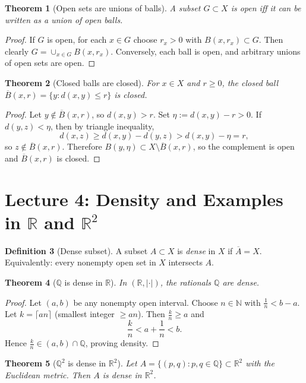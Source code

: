 \documentclass[11pt]{article}
\newtheorem{theorem}{Theorem}[section]
\theoremstyle{definition}
\newtheorem{definition}[theorem]{Definition}
\newcommand{\R}{\mathbb{R}}
\newcommand{\Q}{\mathbb{Q}}
\newcommand{\N}{\mathbb{N}}
\newcommand{\ol}[1]{\overline{#1}}
\begin{document}
\begin{theorem}[Open sets are unions of balls]
A subset $G\subset X$ is open iff it can be written as a union of open balls.
\end{theorem}

\begin{proof}
If $G$ is open, for each $x\in G$ choose $r_x>0$ with $B(x,r_x)\subset G$.
Then clearly $G=\cup_{x\in G} B(x,r_x)$.
Conversely, each ball is open, and arbitrary unions of open sets are open.
\end{proof}

\begin{theorem}[Closed balls are closed]
For $x\in X$ and $r\ge0$, the closed ball $\overline{B}(x,r)=\{y:d(x,y)\le r\}$ is closed.
\end{theorem}

\begin{proof}
Let $y\notin \overline{B}(x,r)$, so $d(x,y)>r$. Set $\eta:=d(x,y)-r>0$.
If $d(y,z)<\eta$, then by triangle inequality,
\[
d(x,z)\ge d(x,y)-d(y,z)>d(x,y)-\eta=r,
\]
so $z\notin \overline{B}(x,r)$. Therefore $B(y,\eta)\subset X\setminus \overline{B}(x,r)$, so the complement is open and $\overline{B}(x,r)$ is closed.
\end{proof}

\section{Lecture 4: Density and Examples in $\R$ and $\R^2$}

\begin{definition}[Dense subset]
A subset $A\subset X$ is \emph{dense} in $X$ if $\ol A=X$.
Equivalently: every nonempty open set in $X$ intersects $A$.
\end{definition}

\begin{theorem}[$\Q$ is dense in $\R$]
In $(\R,|\cdot|)$, the rationals $\Q$ are dense.
\end{theorem}

\begin{proof}
Let $(a,b)$ be any nonempty open interval. Choose $n\in\N$ with $\frac1n<b-a$.
Let $k=\lceil an\rceil$ (smallest integer $\ge an$). Then $\frac{k}{n}\ge a$ and
\[
\frac{k}{n}<a+\frac1n<b.
\]
Hence $\frac{k}{n}\in (a,b)\cap \Q$, proving density.
\end{proof}

\begin{theorem}[$\Q^2$ is dense in $\R^2$]
Let $A=\{(p,q):p,q\in\Q\}\subset\R^2$ with the Euclidean metric. Then $A$ is dense in $\R^2$.
\end{theorem}
\end{document}
